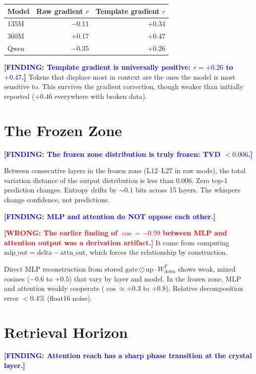 \documentclass[11pt]{article}
\newcommand{\finding}[1]{\textcolor{blue}{\textbf{[FINDING: #1]}}}
\newcommand{\wrong}[1]{\textcolor{red}{\textbf{[WRONG: #1]}}}
\begin{document}
\begin{center}
\begin{tabular}{lrr}
\toprule
Model & Raw gradient $r$ & Template gradient $r$ \\
\midrule
135M & $-$0.11 & +0.34 \\
360M & +0.17 & +0.47 \\
Qwen & $-$0.35 & +0.26 \\
\bottomrule
\end{tabular}
\end{center}

\finding{Template gradient is universally positive: $r = +0.26$ to $+0.47$.} Tokens that displace most in context are the ones the model is most sensitive to. This survives the gradient correction, though weaker than initially reported ($+0.46$ everywhere with broken data).

\section{The Frozen Zone}

\finding{The frozen zone distribution is truly frozen: TVD $< 0.006$.}

Between consecutive layers in the frozen zone (L12--L27 in raw mode), the total variation distance of the output distribution is less than 0.006. Zero top-1 prediction changes. Entropy drifts by $\sim$0.1 bits across 15 layers. The whispers change confidence, not predictions.

\finding{MLP and attention do NOT oppose each other.}

\wrong{The earlier finding of $\cos = -0.99$ between MLP and attention output was a derivation artifact.} It came from computing $\text{mlp\_out} = \text{delta} - \text{attn\_out}$, which forces the relationship by construction.

Direct MLP reconstruction from stored $\text{gate} \odot \text{up} \cdot W_{\text{down}}^T$ shows weak, mixed cosines ($-0.6$ to $+0.5$) that vary by layer and model. In the frozen zone, MLP and attention weakly cooperate ($\cos \approx +0.3$ to $+0.8$). Relative decomposition error $< 0.4\%$ (float16 noise).

\section{Retrieval Horizon}

\finding{Attention reach has a sharp phase transition at the crystal layer.}
\end{document}

